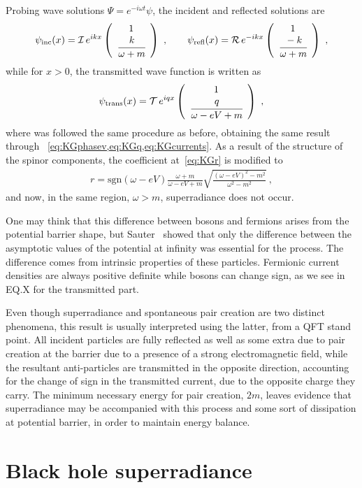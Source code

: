 Probing wave solutions $\Psi= e^{-i\omega t} \psi$, the incident and reflected solutions are
\begin{align}
    \psi_\mathrm{inc}(x) = \mathcal{I}\, e^{i k x} \left(\begin{array}{c} 1 \\ \cfrac{k}{\omega+m} \end{array}\right) ~,\qquad
    \psi_\mathrm{refl}(x) = \mathcal{R}\, e^{- i k x} \left(\begin{array}{c} 1 \\ \cfrac{-k}{\omega+m} \end{array}\right) ~,
    \label{eq:Diracsolneg}   
\end{align}
while for $x>0$, the transmitted wave function is written as 
\begin{align}
    \psi_\mathrm{trans}(x) = \mathcal{T}\, e^{i q x} \left(\begin{array}{c} 1 \\ \cfrac{q}{ \omega - e V + m} \end{array}\right) ~,
    \label{eq:Diracsolpos} 
\end{align}
where was followed the same procedure as before, obtaining the same result through ~\ref{eq:KGphasev,eq:KGq,eq:KGcurrents}. As a result of the structure of the spinor components, the coefficient at~\eqref{eq:KGr} is modified to
\begin{align}
    r = \mathrm{sgn}(\omega - e V)  \frac{\omega+m}{\omega-e V+m} \sqrt{\frac{(\omega - e V)^2 - m^2}{\omega^2 - m^2}} ~,
    \label{eq:Diracr} 
\end{align}
and now, in the same region, $\omega > m$, superradiance does not occur.

One may think that this difference between bosons and fermions arises from the potential barrier shape, but Sauter~\cite{Sauter1931} showed that only the difference between the asymptotic values of the potential at infinity was essential for the process. The difference comes from intrinsic properties of these particles. Fermionic current densities are always positive definite while bosons can change sign, as we see in EQ.X for the transmitted part.  

Even though superradiance and spontaneous pair creation are two distinct phenomena, this result is usually interpreted using the latter, from a QFT stand point. All incident particles are fully reflected as well as some extra due to pair creation at the barrier due to a presence of a strong electromagnetic field, while the resultant anti-particles are transmitted in the opposite direction, accounting for the change of sign in the transmitted current, due to the opposite charge they carry. The minimum necessary energy for pair creation, $2m$, leaves evidence that superradiance may be accompanied with this process and some sort of dissipation at potential barrier, in order to maintain energy balance.   



\section{Black hole superradiance}




\cleardoublepage

